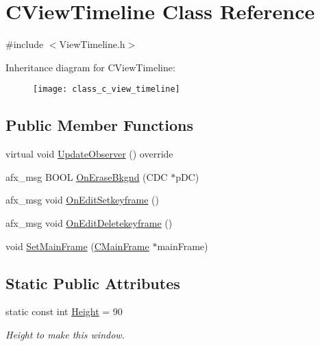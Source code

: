 \hypertarget{class_c_view_timeline}{\section{C\+View\+Timeline Class Reference}
\label{class_c_view_timeline}
}


{\ttfamily \#include $<$View\+Timeline.\+h$>$}

Inheritance diagram for C\+View\+Timeline\+:\begin{figure}[H]
\begin{center}
\leavevmode
\texttt{[image: class\_c\_view\_timeline]}
\end{center}
\end{figure}
\subsection*{Public Member Functions}
\begin{DoxyCompactItemize}
\item 
virtual void \hyperlink{class_c_view_timeline_a21388abd4726fd3dbe02b6e2ea313369}{Update\+Observer} () override
\item 
afx\+\_\+msg B\+O\+O\+L \hyperlink{class_c_view_timeline_a8328ae76e5f95d36b3ab7e8bbd8ef72f}{On\+Erase\+Bkgnd} (C\+D\+C $\ast$p\+D\+C)
\item 
afx\+\_\+msg void \hyperlink{class_c_view_timeline_acb22f2662a21152e607d17dbc293351c}{On\+Edit\+Setkeyframe} ()
\item 
afx\+\_\+msg void \hyperlink{class_c_view_timeline_ab3eccb4a5bcd5ffa60442359b86e0597}{On\+Edit\+Deletekeyframe} ()
\item 
void \hyperlink{class_c_view_timeline_aba069993dd75712f340999345e791327}{Set\+Main\+Frame} (\hyperlink{class_c_main_frame}{C\+Main\+Frame} $\ast$main\+Frame)
\end{DoxyCompactItemize}
\subsection*{Static Public Attributes}
\begin{DoxyCompactItemize}
\item 
\hypertarget{class_c_view_timeline_a6634479092090825e8c392902cf6c685}{static const int \hyperlink{class_c_view_timeline_a6634479092090825e8c392902cf6c685}{Height} = 90}\label{class_c_view_timeline_a6634479092090825e8c392902cf6c685}

\begin{DoxyCompactList}\small\item\em Height to make this window. \end{DoxyCompactList}\end{DoxyCompactItemize}
